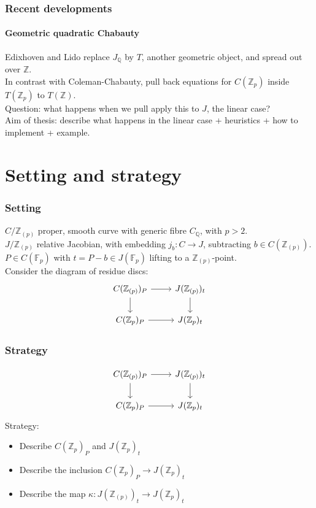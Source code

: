 \documentclass[15pt]{beamer}
\newcommand{\Z}{\mathbb{Z}}
\newcommand{\Q}{\mathbb{Q}}
\newcommand{\F}{\mathbb{F}}
\begin{document}
\begin{frame}
    \frametitle{Recent developments}
    \framesubtitle{Geometric quadratic Chabauty}
    Edixhoven and Lido replace $J_\Q$ by $T$, another geometric object, and spread out over $\Z$.\\\pause
    In contrast with Coleman-Chabauty, pull back equations for $C(\Z_p)$ inside $T(\Z_p)$ to $T(\Z)$. \\\pause
    Question: what happens when we pull apply this to $J$, the linear case?\\\pause
    Aim of thesis: describe what happens in the linear case +  heuristics + how to implement + example.
\end{frame}

\section{Setting and strategy}
\begin{frame}
    \frametitle{Setting}
    $C/\Z_{(p)}$ proper, smooth curve with generic fibre $C_\Q$, with $p > 2$.\\\pause
    $J/\Z_{(p)}$ relative Jacobian, with embedding $j_b: C \to J$, subtracting $b \in C(\Z_{(p)})$.\\\pause
    $P \in C(\F_p)$ with $t = P - b \in J(\F_p)$ lifting to a $\Z_{(p)}$-point.\\\pause
    Consider the diagram of residue discs:\[
    \begin{tikzcd}[ampersand replacement=\&]
        C(\Z_{(p)})_P \arrow[d] \arrow[r] \& J(\Z_{(p)})_t \arrow[d] \\
        C(\Z_p)_P \arrow[r]              \& J(\Z_p)_t        
    \end{tikzcd} \]
\end{frame}

\begin{frame}
    \frametitle{Strategy}
    \[
    \begin{tikzcd}[ampersand replacement=\&]
        C(\Z_{(p)})_P \arrow[d] \arrow[r] \& J(\Z_{(p)})_t \arrow[d] \\
        C(\Z_p)_P \arrow[r]              \& J(\Z_p)_t        
    \end{tikzcd} \]
    Strategy:
    \begin{itemize}[<+->]
        \item Describe $C(\Z_p)_P$ and $J(\Z_p)_t$
        \item Describe the inclusion $C(\Z_p)_P \to J(\Z_p)_t  $
        \item Describe the map $\kappa: J(\Z_{(p)})_t \to J(\Z_p)_t$
    \end{itemize}
\end{frame}
\end{document}
